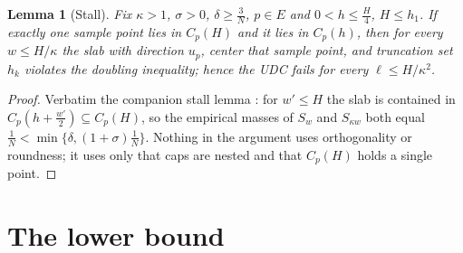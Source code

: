 \documentclass[11pt]{article}
\newtheorem{lemma}[theorem]{Lemma}
\theoremstyle{definition}
\theoremstyle{remark}
\begin{document}
\begin{lemma}[Stall]\label{lem:stall}
Fix $\kappa>1$, $\sigma>0$, $\delta\ge\frac3N$, $p\in E$ and
$0<h\le\frac H4$, $H\le h_1$.  If exactly one sample point lies in $C_p(H)$ and
it lies in $C_p(h)$, then for every $w\le H/\kappa$ the slab with direction
$u_p$, center that sample point, and truncation set $h_k$ violates the doubling
inequality; hence the UDC fails for every $\ell\le H/\kappa^2$.
\end{lemma}

\begin{proof}
Verbatim the companion stall lemma \cite[Lemma 2.4]{companion11}: for
$w'\le H$ the slab is contained in $C_p(h+\frac{w'}2)\subseteq C_p(H)$, so the
empirical masses of $S_w$ and $S_{\kappa w}$ both equal $\frac1N<
\min\{\delta,(1+\sigma)\frac1N\}$.  Nothing in the argument uses orthogonality
or roundness; it uses only that caps are nested and that $C_p(H)$ holds a
single point.
\end{proof}

\section{The lower bound}\label{sec:lower}
\end{document}
